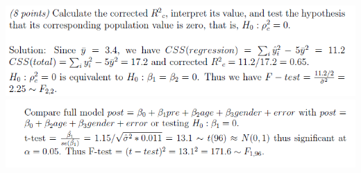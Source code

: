 \documentclass[10pt,landscape]{article}
\begin{document}
\includegraphics[scale=.6]{fig/rc.png}
\includegraphics[scale=.6]{fig/mt3.png}
\begin{multicols*}{4}
\setlength{\premulticols}{1pt}
\setlength{\postmulticols}{1pt}
\setlength{\multicolsep}{1pt}
\setlength{\columnsep}{2pt}


\end{multicols*}
\end{document}
